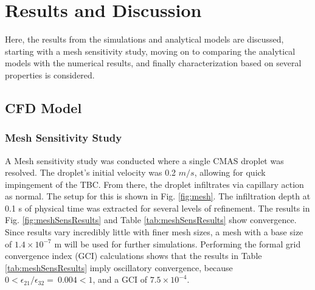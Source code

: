 \documentclass[%
 aip,
 amsmath,amssymb,
 reprint,%
]{revtex4-1}
\begin{document}
\section{Results and Discussion}
Here, the results from the simulations and analytical models are discussed, starting with a mesh sensitivity study, moving on to comparing the analytical models with the numerical results, and finally characterization based on several properties is considered.

\subsection{CFD Model}
\subsubsection{Mesh Sensitivity Study}
A Mesh sensitivity study was conducted where a single CMAS droplet was resolved. The droplet's initial velocity was 0.2 $m/s$, allowing for quick impingement of the TBC. From there, the droplet infiltrates via capillary action as normal. The setup for this is shown in Fig. \ref{fig:mesh}. The infiltration depth at 0.1 s of physical time was extracted for several levels of refinement. The results in Fig. \ref{fig:meshSensResults} and Table \ref{tab:meshSensResults} show convergence. Since results vary incredibly little with finer mesh sizes, a mesh with a base size of ${1.4\times 10^{-7}}$ m will be used for further simulations. Performing the formal grid convergence index (GCI) calculations \cite{ECA2014104, celik2008procedure} shows that the results in Table \ref{tab:meshSensResults} imply oscillatory convergence, because  $0<\epsilon_{21}/\epsilon_{32}=\ 0.004<1$, and a GCI of $7.5\times 10^{-4}$.
\end{document}
